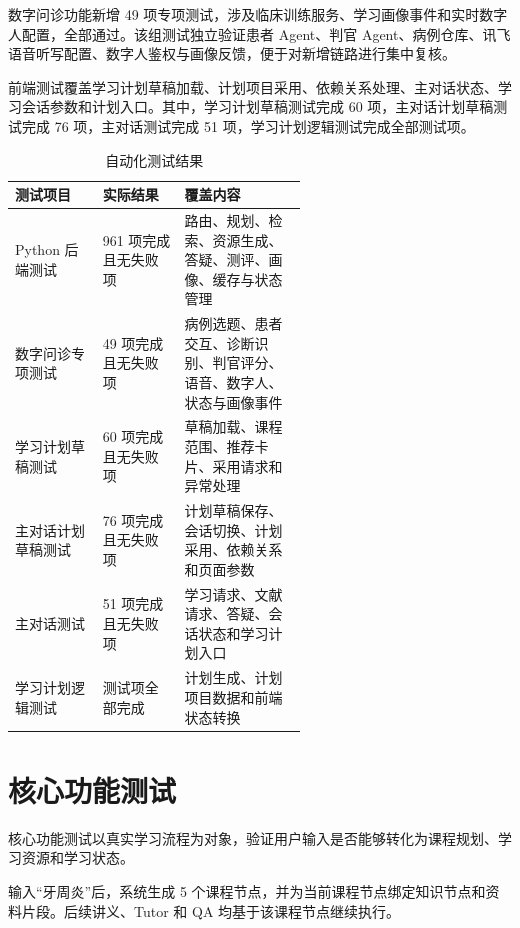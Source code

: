 数字问诊功能新增 49 项专项测试，涉及临床训练服务、学习画像事件和实时数字人配置，全部通过。该组测试独立验证患者 Agent、判官 Agent、病例仓库、讯飞语音听写配置、数字人鉴权与画像反馈，便于对新增链路进行集中复核。

前端测试覆盖学习计划草稿加载、计划项目采用、依赖关系处理、主对话状态、学习会话参数和计划入口。其中，学习计划草稿测试完成 60 项，主对话计划草稿测试完成 76 项，主对话测试完成 51 项，学习计划逻辑测试完成全部测试项。

\begin{table}[H]
  \centering
  \caption{自动化测试结果}
  \label{tab:automated-test}
  \begin{tabularx}{\linewidth}{p{0.30\linewidth}p{0.28\linewidth}X}
    \toprule
    测试项目 & 实际结果 & 覆盖内容 \\
    \midrule
    Python 后端测试 & 961 项完成且无失败项 & 路由、规划、检索、资源生成、答疑、测评、画像、缓存与状态管理 \\
    数字问诊专项测试 & 49 项完成且无失败项 & 病例选题、患者交互、诊断识别、判官评分、语音、数字人、状态与画像事件 \\
    学习计划草稿测试 & 60 项完成且无失败项 & 草稿加载、课程范围、推荐卡片、采用请求和异常处理 \\
    主对话计划草稿测试 & 76 项完成且无失败项 & 计划草稿保存、会话切换、计划采用、依赖关系和页面参数 \\
    主对话测试 & 51 项完成且无失败项 & 学习请求、文献请求、答疑、会话状态和学习计划入口 \\
    学习计划逻辑测试 & 测试项全部完成 & 计划生成、计划项目数据和前端状态转换 \\
    \bottomrule
  \end{tabularx}
\end{table}

\section{核心功能测试}

核心功能测试以真实学习流程为对象，验证用户输入是否能够转化为课程规划、学习资源和学习状态。

输入“牙周炎”后，系统生成 5 个课程节点，并为当前课程节点绑定知识节点和资料片段。后续讲义、Tutor 和 QA 均基于该课程节点继续执行。

